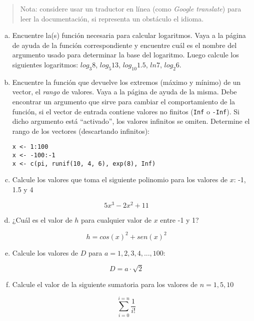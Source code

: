 \documentclass[]{article}
\begin{document}
\begin{quote}
Nota: considere usar un traductor en línea (como \emph{Google
translate}) para leer la documentación, si representa un obstáculo el
idioma.

\end{quote}
\begin{enumerate}[a.]
\item
  Encuentre la(s) función necesaria para calcular logaritmos. Vaya a la
  página de ayuda de la función correspondiente y encuentre cuál es el
  nombre del argumento usado para determinar la base del logaritmo.
  Luego calcule los siguientes logaritmos: $log_3 8$, $log_5 13$,
  $log_{10} 1.5$, $ln 7$, $log_{2} 6$.
\item
  Encuentre la función que devuelve los extremos (máximo y mínimo) de un
  vector, el \emph{rango} de valores. Vaya a la página de ayuda de la
  misma. Debe encontrar un argumento que sirve para cambiar el
  comportamiento de la función, si el vector de entrada contiene valores
  no finitos (\texttt{Inf} o \texttt{-Inf}). Si dicho argumento está
  ``activado'', los valores infinitos se omiten. Determine el rango de
  los vectores (descartando infinitos):

\begin{verbatim}
x <- 1:100
x <- -100:-1
x <- c(pi, runif(10, 4, 6), exp(8), Inf)
\end{verbatim}
\item
  Calcule los valores que toma el siguiente polinomio para los valores
  de $x$: -1, 1.5 y 4
\end{enumerate}
\[
  5 x ^ 3 - 2 x ^ 2 + 11
\]

\begin{enumerate}[a.]
\setcounter{enumi}{3}
\item
  ¿Cuál es el valor de $h$ para cualquier valor de $x$ entre -1 y 1?
\end{enumerate}
\[
  h = cos(x) ^ 2 + sen(x) ^ 2
\]

\begin{enumerate}[a.]
\setcounter{enumi}{4}
\item
  Calcule los valores de $D$ para $a = 1, 2, 3, 4, ..., 100$:
\end{enumerate}
\[
  D = a \cdot \sqrt{2}
\]

\begin{enumerate}[a.]
\setcounter{enumi}{5}
\item
  Calcule el valor de la siguiente sumatoria para los valores de
  $n = 1, 5, 10$
\end{enumerate}
\[
  \sum_{i = 0} ^{i = n} \frac{1}{i!}
\]
\end{document}
